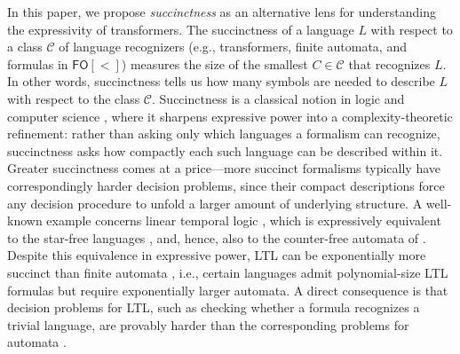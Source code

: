 \documentclass{article} %
\newcommand{\Lang}{L}
\newcommand{\classC}{\mathcal{C}}
\begin{document}
In this paper, we propose \emph{succinctness} as an alternative lens for
understanding the expressivity of transformers. 
The succinctness of a
language $\Lang$ with respect to a class $\classC$ of language
recognizers (e.g., transformers, finite automata, and formulas in $\textsf{FO}[<]$) measures the size of the
smallest $C \in \classC$ that recognizes $\Lang$.
In other words, succinctness tells us how many symbols
are needed to describe $\Lang$ with respect to the class $\classC$. 
Succinctness is a classical notion in logic
and computer science \citep{Stockmeyer-thesis,GS04}, where it
sharpens expressive power into a complexity-theoretic refinement: rather than asking only which languages a formalism can recognize, succinctness asks how compactly each such language can be described within it. Greater succinctness comes at a price---more succinct formalisms typically have correspondingly harder decision problems, since their compact descriptions force any decision procedure to unfold a larger amount of underlying structure.
A well-known
example concerns linear temporal logic \citep[LTL;][]{pnueli-ltl}, which is
expressively equivalent to the star-free languages
\citep{libkin-book}, and, hence, also to the counter-free automata of
\citet{counter-free-book}. 
Despite this equivalence in expressive power,
LTL can be exponentially more succinct than finite automata
\citep{SistlaC85}, i.e., certain languages admit polynomial-size LTL formulas
but require exponentially larger automata. A direct consequence is that
decision problems for LTL, such as checking whether a formula recognizes a
trivial language, are provably harder than the corresponding problems for
automata \citep{SistlaC85}.
\end{document}
